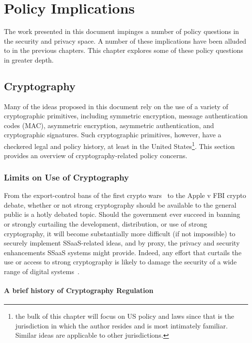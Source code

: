 \chapter{Policy Implications}
\label{chap:policy}

The work presented in this document impinges a number of policy
questions in the security and privacy space. A number of these
implications have been alluded to in the previous chapters. This
chapter explores some of these policy questions in greater depth.

\section{Cryptography}
\label{chap:policy:crypto}

Many of the ideas proposed in this document rely on the use of a
variety of cryptographic primitives, including symmetric encryption,
message authentication codes (MAC), asymmetric encryption, asymmetric
authentication, and cryptographic signatures. Such cryptographic
primitives, however, have a checkered legal and policy history, at
least in the United States\footnote{the bulk of this chapter will
  focus on US policy and laws since that is the jurisdiction in which
  the author resides and is most intimately familiar. Similar ideas
  are applicable to other jurisdictions.}. This section provides an
overview of cryptography-related policy concerns.

\subsection{Limits on Use of Cryptography}
\label{chap:policy:crypto:limits}

From the export-control bans of the first crypto wars~\cite{kehl2015}
to the Apple v FBI crypto debate, whether or not strong cryptography
should be available to the general public is a hotly debated
topic. Should the government ever succeed in banning or strongly
curtailing the development, distribution, or use of strong
cryptography, it will become substantially more difficult (if not
impossible) to securely implement SSaaS-related ideas, and by proxy,
the privacy and security enhancements SSaaS systems might
provide. Indeed, any effort that curtails the use or access to strong
cryptography is likely to damage the security of a wide range of digital
systems~\cite{abelson2015}.

\subsubsection{A brief history of Cryptography Regulation}


